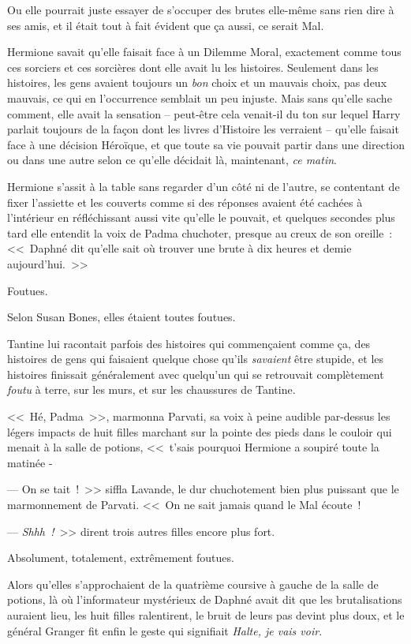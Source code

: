 Ou elle pourrait juste essayer de s'occuper des brutes elle-même sans rien dire à ses amis, et il était tout à fait évident que ça aussi, ce serait Mal.

Hermione savait qu'elle faisait face à un Dilemme Moral, exactement comme tous ces sorciers et ces sorcières dont elle avait lu les histoires. Seulement dans les histoires, les gens avaient toujours un \emph{bon} choix et un mauvais choix, pas deux mauvais, ce qui en l'occurrence semblait un peu injuste. Mais sans qu'elle sache comment, elle avait la sensation -- peut-être cela venait-il du ton sur lequel Harry parlait toujours de la façon dont les livres d'Histoire les verraient -- qu'elle faisait face à une décision Héroïque, et que toute sa vie pouvait partir dans une direction ou dans une autre selon ce qu'elle décidait là, maintenant, \emph{ce matin}.

Hermione s'assit à la table sans regarder d'un côté ni de l'autre, se contentant de fixer l'assiette et les couverts comme si des réponses avaient été cachées à l'intérieur en réfléchissant aussi vite qu'elle le pouvait, et quelques secondes plus tard elle entendit la voix de Padma chuchoter, presque au creux de son oreille~: <<~Daphné dit qu'elle sait où trouver une brute à dix heures et demie aujourd'hui.~>>

\later

Foutues.

Selon Susan Bones, elles étaient toutes foutues.

Tantine lui racontait parfois des histoires qui commençaient comme ça, des histoires de gens qui faisaient quelque chose qu'ils \emph{savaient} être stupide, et les histoires finissait généralement avec quelqu'un qui se retrouvait complètement \emph{foutu} à terre, sur les murs, et sur les chaussures de Tantine.

<<~Hé, Padma~>>, marmonna Parvati, sa voix à peine audible par-dessus les légers impacts de huit filles marchant sur la pointe des pieds dans le couloir qui menait à la salle de potions, <<~t'sais pourquoi Hermione a soupiré toute la matinée -

--- On se tait~!~>> siffla Lavande, le dur chuchotement bien plus puissant que le marmonnement de Parvati. <<~On ne sait jamais quand le Mal écoute~!

--- \emph{Shhh~!}~>> dirent trois autres filles encore plus fort.

Absolument, totalement, extrêmement foutues.

Alors qu'elles s'approchaient de la quatrième coursive à gauche de la salle de potions, là où l'informateur mystérieux de Daphné avait dit que les brutalisations auraient lieu, les huit filles ralentirent, le bruit de leurs pas devint plus doux, et le général Granger fit enfin le geste qui signifiait \emph{Halte, je vais voir}.

